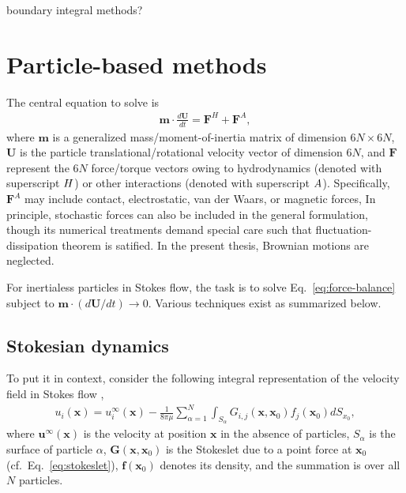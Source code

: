 boundary integral methods?


\section{Particle-based methods}
\label{sec:num-dem}

The central equation to solve is
\begin{equation} 
 \begin{aligned} \label{eq:force-balance}
  {\bm m} \cdot \frac{d{\bm U}}{dt} = {\bm F}^H + {\bm F}^A, 
 \end{aligned}
\end{equation}
where ${\bm m}$ is a generalized mass/moment-of-inertia matrix of dimension $6N \times 6N$,
${\bm U}$ is the particle translational/rotational velocity vector of dimension $6N$,
and ${\bm F}$ represent the $6N$ force/torque vectors owing to hydrodynamics (denoted with superscript $\footnotesize H$) or other interactions (denoted with superscript $\footnotesize A$). Specifically, ${\bm F}^A$ may include contact, electrostatic, van der Waars, or magnetic forces, \etc In principle, stochastic forces can also be included in the general formulation, though its numerical treatments demand special care such that fluctuation-dissipation theorem is satified. In the present thesis, Brownian motions are neglected.

For inertialess particles in Stokes flow, the task is to solve Eq.\ \eqref{eq:force-balance} subject to ${\bm m} \cdot (d{\bm U}/dt) \to 0$. Various techniques exist as summarized below.

\subsection{Stokesian dynamics}
\label{subsec:sd}

To put it in context, consider the following integral representation of the velocity field in Stokes flow \citep{Ladyzhenskaya},
\begin{equation} \label{eq:boundary-integral}
 \begin{aligned}
  u_i(\bm{x}) = u_i^\infty(\bm{x}) - \frac{1}{8\pi \mu} \sum_{\alpha=1}^N  \int_{S_\alpha} G_{i,j} (\bm{x},\bm{x}_0) f_j(\bm{x}_0) dS_{x_0},
 \end{aligned}
\end{equation}
where $\bm{u}^\infty(\bm{x})$ is the velocity at position $\bm{x}$ in the absence of particles,
$S_\alpha$ is the surface of particle $\alpha$,
$\bm{G}(\bm{x},\bm{x}_0)$ is the Stokeslet due to a point force at $\bm{x}_0$ (cf.\ Eq.\ \ref{eq:stokeslet}),
$\bm f(\bm{x}_0)$ denotes its density,
and the summation is over all $N$ particles.

